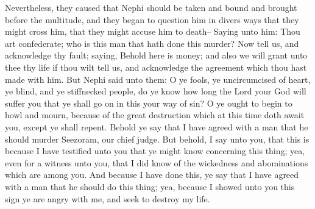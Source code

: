 Nevertheless, they caused that Nephi should be taken and bound and brought before the multitude, and they began to question him in divers ways that they might cross him, that they might accuse him to death--
\bverse \iffalse Saying unto him: Thou art confederate; who is this man that hath done this murder? Now tell us, and acknowledge thy fault; saying, Behold here is money; and also we will grant unto thee thy life if thou wilt tell us, and acknowledge the agreement which thou hast made with him. \fi
Saying unto him: Thou art confederate; who is this man that hath done this murder? Now tell us, and acknowledge thy fault; saying, Behold here is money; and also we will grant unto thee thy life if thou wilt tell us, and acknowledge the agreement which thou hast made with him.
\bverse \iffalse But Nephi said unto them: O ye fools, ye uncircumcised of heart, ye blind, and ye stiffnecked people, do ye know how long the Lord your God will suffer you that ye shall go on in this your way of sin? \fi
But Nephi said unto them: O ye fools, ye uncircumcised of heart, ye blind, and ye stiffnecked people, do ye know how long the Lord your God will suffer you that ye shall go on in this your way of sin?
\bverse \iffalse O ye ought to begin to howl and mourn, because of the great destruction which at this time doth await you, except ye shall repent. \fi
O ye ought to begin to howl and mourn, because of the great destruction which at this time doth await you, except ye shall repent.
\bverse \iffalse Behold ye say that I have agreed with a man that he should murder Seezoram, our chief judge. But behold, I say unto you, that this is because I have testified unto you that ye might know concerning this thing; yea, even for a witness unto you, that I did know of the wickedness and abominations which are among you. \fi
Behold ye say that I have agreed with a man that he should murder Seezoram, our chief judge. But behold, I say unto you, that this is because I have testified unto you that ye might know concerning this thing; yea, even for a witness unto you, that I did know of the wickedness and abominations which are among you.
\bverse \iffalse And because I have done this, ye say that I have agreed with a man that he should do this thing; yea, because I showed unto you this sign ye are angry with me, and seek to destroy my life. \fi
And because I have done this, ye say that I have agreed with a man that he should do this thing; yea, because I showed unto you this sign ye are angry with me, and seek to destroy my life.
